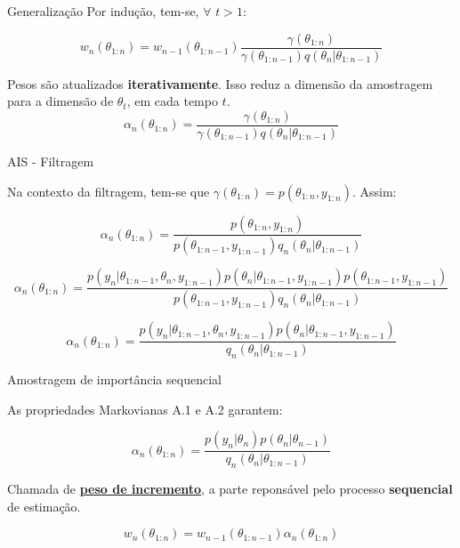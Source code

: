 \documentclass{beamer}
\begin{document}
\begin{frame}{Generalização}
Por indução, tem-se, $\forall$ $t>1$:

$$
w_n(\theta_{1:n}) = w_{n-1}(\theta_{1:n-1}) \frac{\gamma(\theta_{1:n})}{\gamma(\theta_{1:n-1})q(\theta_n|\theta_{1:n-1})}
$$

\pause
\vspace{0.5cm}

Pesos são atualizados \textbf{iterativamente}. Isso reduz a dimensão da amostragem para a dimensão de $\theta_t$, em cada tempo $t$.
$$
\alpha_n(\theta_{1:n}) = \frac{\gamma(\theta_{1:n})}{\gamma(\theta_{1:n-1})q(\theta_n|\theta_{1:n-1})}
$$
\end{frame}




\begin{frame}{AIS - Filtragem}

Na contexto da filtragem, tem-se que $\gamma(\theta_{1:n}) = p(\theta_{1:n},y_{1:n})$. Assim:

$$
\alpha_n(\theta_{1:n}) = \frac{p(\theta_{1:n},y_{1:n})}{p(\theta_{1:n-1},y_{1:n-1})q_n(\theta_n|\theta_{1:n-1})}
$$

\pause

$$
\alpha_n(\theta_{1:n}) = \frac{p(y_{n}|\theta_{1:n-1},\theta_n,y_{1:n-1})p(\theta_{n}|\theta_{1:n-1},y_{1:n-1})p(\theta_{1:n-1},y_{1:n-1})}{p(\theta_{1:n-1},y_{1:n-1})q_n(\theta_n|\theta_{1:n-1})}
$$

\pause

$$
\alpha_n(\theta_{1:n}) = \frac{p(y_{n}|\theta_{1:n-1},\theta_n,y_{1:n-1})p(\theta_{n}|\theta_{1:n-1},y_{1:n-1})}{q_n(\theta_n|\theta_{1:n-1})}
$$
\end{frame}

\begin{frame}{Amostragem de importância sequencial}

As propriedades Markovianas A.1 e A.2 garantem:

$$
\alpha_n(\theta_{1:n}) = \frac{p(y_{n}|\theta_n)p(\theta_{n}|\theta_{n-1})}{q_n(\theta_n|\theta_{1:n-1})}
$$

\pause

Chamada de \underline{\textbf{peso de incremento}}, a parte reponsável pelo processo \textbf{sequencial} de estimação.


$$
w_n(\theta_{1:n}) = w_{n-1}(\theta_{1:n-1}) \alpha_n(\theta_{1:n})
$$


\end{frame}
\end{document}
